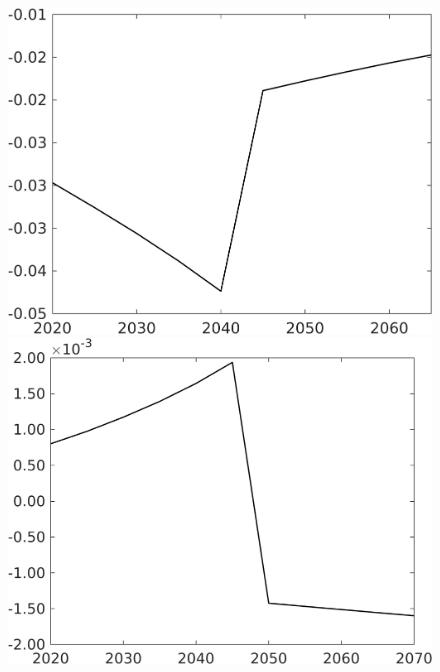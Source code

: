 \begin{figure}[h!!!]
\begin{minipage}[]{0.32\textwidth}
	\end{minipage}
	\begin{minipage}[]{0.32\textwidth}
		\includegraphics[width=1\textwidth]{../../codding_model/own_basedOnFried/optimalPol_010922_revision/figures/all_13Sept22_Tplus30/gAn_OPT_COMPtaulPer_regime4_spillover0_knspil1_noskill0_sep0_xgrowth0_PV1_etaa0.79.png}
	\end{minipage}
	\begin{minipage}[]{0.32\textwidth}
		\includegraphics[width=1\textwidth]{../../codding_model/own_basedOnFried/optimalPol_010922_revision/figures/all_13Sept22_Tplus30/SWF_OPT_COMPtaulPer_regime4_spillover0_knspil1_noskill0_sep0_xgrowth0_PV1_etaa0.79.png}
	\end{minipage}
\end{figure} 


